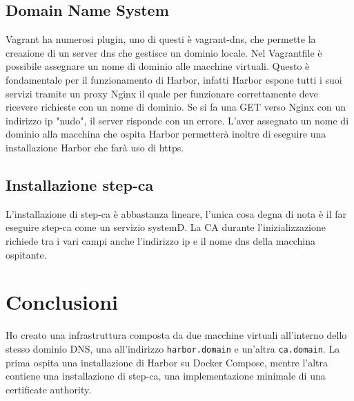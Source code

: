 \documentclass[12pt,a4paper]{report}
\begin{document}
\section{Domain Name System}
Vagrant ha numerosi plugin, uno di questi è vagrant-dns, che permette la creazione di un server dns che gestisce un dominio locale. Nel Vagrantfile è possibile assegnare un nome di dominio alle macchine virtuali. Questo è fondamentale per il funzionamento di Harbor, infatti Harbor espone tutti i suoi servizi tramite un proxy Nginx il quale per funzionare correttamente deve ricevere richieste con un nome di dominio. Se si fa una GET verso Nginx con un indirizzo ip "nudo", il server risponde con un errore.
L'aver assegnato un nome di dominio alla macchina che ospita Harbor permetterà inoltre di eseguire una installazione Harbor che farà uso di https.

\section{Installazione step-ca}
L'installazione di step-ca è abbastanza lineare, l'unica cosa degna di nota è il far eseguire step-ca come un servizio systemD. La CA durante l'inizializzazione richiede tra i vari campi anche l'indirizzo ip e il nome dns della macchina ospitante.

\chapter{Conclusioni}
Ho creato una infrastruttura composta da due macchine virtuali all'interno dello stesso dominio DNS, una all'indirizzo \texttt{harbor.domain} e un'altra \texttt{ca.domain}. La prima ospita una installazione di Harbor su Docker Compose, mentre l'altra contiene una installazione di step-ca, una implementazione minimale di una certificate authority. 
\end{document}
